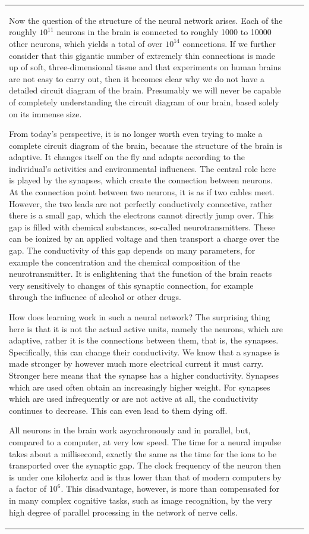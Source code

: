 \documentclass[10pt]{book}
\begin{document}
\begin{center}
\begin{tabular}{|l|l|l|}
Now the question of the structure of the neural network arises. Each of the roughly $10^{11}$ neurons in the brain is connected to roughly 1000 to 10000 other neurons, which yields a total of over $10^{14}$ connections. If we further consider that this gigantic number of extremely thin connections is made up of soft, three-dimensional tissue and that experiments on human brains are not easy to carry out, then it becomes clear why we do not have a detailed circuit diagram of the brain. Presumably we will never be capable of completely understanding the circuit diagram of our brain, based solely on its immense size.

From today's perspective, it is no longer worth even trying to make a complete circuit diagram of the brain, because the structure of the brain is adaptive. It changes itself on the fly and adapts according to the individual's activities and environmental influences. The central role here is played by the synapses, which create the connection between neurons. At the connection point between two neurons, it is as if two cables meet. However, the two leads are not perfectly conductively connective, rather there is a small gap, which the electrons cannot directly jump over. This gap is filled with chemical substances, so-called neurotransmitters. These can be ionized by an applied voltage and then transport a charge over the gap. The conductivity of this gap depends on many parameters, for example the concentration and the chemical composition of the neurotransmitter. It is enlightening that the function of the brain reacts very sensitively to changes of this synaptic connection, for example through the influence of alcohol or other drugs.

How does learning work in such a neural network? The surprising thing here is that it is not the actual active units, namely the neurons, which are adaptive, rather it is the connections between them, that is, the synapses. Specifically, this can change their conductivity. We know that a synapse is made stronger by however much more electrical current it must carry. Stronger here means that the synapse has a higher conductivity. Synapses which are used often obtain an increasingly higher weight. For synapses which are used infrequently or are not active at all, the conductivity continues to decrease. This can even lead to them dying off.

All neurons in the brain work asynchronously and in parallel, but, compared to a computer, at very low speed. The time for a neural impulse takes about a millisecond, exactly the same as the time for the ions to be transported over the synaptic gap. The clock frequency of the neuron then is under one kilohertz and is thus lower than that of modern computers by a factor of $10^{6}$. This disadvantage, however, is more than compensated for in many complex cognitive tasks, such as image recognition, by the very high degree of parallel processing in the network of nerve cells.


\end{tabular}
\end{center}
\end{document}
